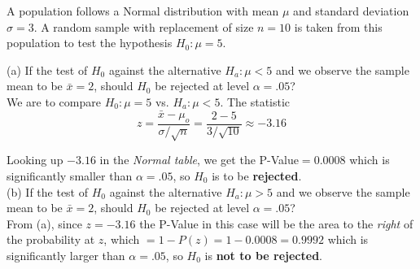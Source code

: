 \documentclass[boxes, qed]{homework}
\begin{document}
\begin{problem} A population follows a Normal distribution with mean $\mu$ and standard deviation $\sigma=3$.
  A random sample with replacement of size $n=10$ is taken from this population to test the hypothesis
  $H_0: \mu=5$.
\end{problem}
\begin{solution}(a) If the test of $H_0$ against the alternative $H_a: \mu<5$ and we observe the sample mean
  to be $\bar{x}=2$, should $H_0$ be rejected at level $\alpha=.05$?\\

  We are to compare $H_0: \mu=5$ vs. $H_a: \mu<5$. The statistic
  $$z=\frac{\bar{x}-\mu_o}{\sigma/\sqrt{n}} 
  = \frac{2-5}{3/\sqrt{10}}
  \approx -3.16 $$

  Looking up $-3.16$ in the \textit{Normal table}, we get the P-Value$=0.0008$
  which is significantly smaller than $\alpha=.05$, so $H_0$ is to be \textbf{rejected}.\\

  (b) If the test of $H_0$ against the alternative $H_a: \mu>5$ and we observe the sample mean to be
  $\bar{x}=2$, should $H_0$ be rejected at level $\alpha=.05$?\\

  From (a), since $z=-3.16$ the P-Value in this case will be the area to the \textit{right} of the
  probability at $z$, which $=1-P(z)=1-0.0008=0.9992$
  which is significantly larger than $\alpha=.05$, so $H_0$ is \textbf{not to be rejected}.\\
\end{solution}
\end{document}
